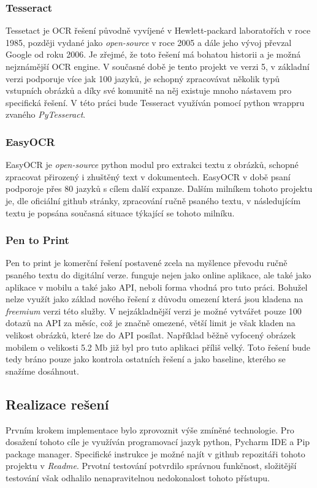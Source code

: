 \documentclass[journal]{IEEEtran}
\begin{document}
\subsubsection{Tesseract}
Tessetact je \ac{OCR} řešení původně vyvíjené v Hewlett-packard laboratořích v roce 1985, později vydané jako \textit{open-source} v roce 2005 a dále jeho vývoj převzal Google od roku 2006.
Je zřejmé, že toto řešení má bohatou historii a je možná nejznámější \ac{OCR} engine.
V současné době je tento projekt ve verzi 5, v základní verzi podporuje více jak 100 jazyků, je schopný zpracovávat několik typů vstupních obrázků a díky své komunitě na něj existuje mnoho nástavem pro specifická řešení.
V této práci bude Tesseract využíván pomocí python wrappru zvaného \textit{PyTesseract}.

\subsubsection{EasyOCR}
EasyOCR je \textit{open-source} python modul pro extrakci textu z obrázků, schopné zpracovat přirozený i zhuštěný text v dokumentech.
EasyOCR v době psaní  podporoje přes 80 jazyků s cílem další expanze.
Dalším milníkem tohoto projektu je, dle oficiální github stránky, zpracování ručně psaného textu, v následujícím textu je popsána současná situace týkající se tohoto milníku.\cite{easy_ocr}

\subsubsection{Pen to Print}
Pen to print je komerční řešení postavené zcela na myšlence převodu ručně psaného textu do digitální verze.
funguje nejen jako online aplikace, ale také jako aplikace v mobilu a také jako \ac{API}, neboli forma vhodná pro tuto práci.
Bohužel nelze využít jako základ nového řešení z důvodu omezení která jsou kladena na \textit{freemium} verzi této služby.
V nejzákladnější verzi je možné vytvářet pouze 100 dotazů na \ac{API} za měsíc, což je značně omezené, větší limit je však kladen na velikost obrázků, které lze do \ac{API} posílat.
Například běžně vyfocený obrázek mobilem o velikosti 5.2 Mb již byl pro tuto aplikaci příliš velký.
Toto řešení bude tedy bráno pouze jako kontrola ostatních řešení a jako baseline, kterého se snažíme dosáhnout.
%
\subsection{Realizace rešení}
Prvním krokem implementace bylo zprovoznit výše zmíněné technologie.
Pro dosažení tohoto cíle je využíván programovací jazyk python, Pycharm \ac{IDE} a Pip package manager.
Specifické instrukce je možné najít v github repozitáři tohoto projektu v \textit{Readme}.
Prvotní testování potvrdilo správnou funkčnost, složitější testování však odhalilo nenapravitelnou nedokonalost tohoto přístupu.
\end{document}
